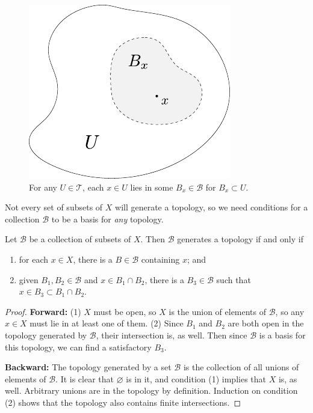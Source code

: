 \documentclass[10pt]{report}
\begin{document}
\begin{figure}[H]
	\centering
	\includegraphics[scale=0.8]{fig/gen-top.pdf}
	\caption{For any $U \in \mathcal{T}$, each $x \in U$ lies in some $B_x \in \mathcal{B}$ for $B_x \subset U$.}
\end{figure}


Not every set of subsets of $X$ will generate a topology, so we need conditions for a collection $\mathcal{B}$ to be a basis for \textit{any} topology.

\begin{prop}
\label{prop:basis-for-any-top}
Let $\mathcal{B}$ be a collection of subsets of $X$. Then $\mathcal{B}$ generates a topology if and only if
\begin{enumerate}
	\item for each $x \in X$, there is a $B \in \mathcal{B}$ containing $x$; and
	\item given $B_1,B_2 \in \mathcal{B}$ and $x \in B_1 \cap B_2$, there is a $B_3 \in \mathcal{B}$ such that $x \in B_3 \subset B_1 \cap B_2$.
\end{enumerate}
\end{prop}
\begin{proof}
	\textbf{Forward:} (1) $X$ must be open, so $X$ is the union of elements of $\mathcal{B}$, so any $x \in X$ must lie in at least one of them. (2) Since $B_1$ and $B_2$ are both open in the topology generated by $\mathcal{B}$, their intersection is, as well. Then since $\mathcal{B}$ is a basis for this topology, we can find a satisfactory $B_3$.

	\textbf{Backward:} The topology generated by a set $\mathcal{B}$ is the collection of all unions of elements of $\mathcal{B}$. It is clear that $\varnothing$ is in it, and condition (1) implies that $X$ is, as well. Arbitrary unions are in the topology by definition. Induction on condition (2) shows that the topology also contains finite intersections.
\end{proof}
\end{document}
